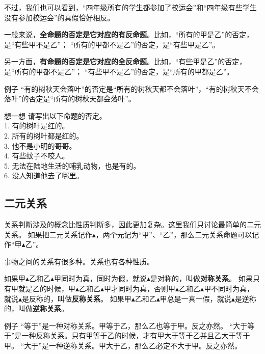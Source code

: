 \documentclass[12pt,UTF8,a4paper]{article}
\begin{document}
不过，我们也可以看到，“四年级所有的学生都参加了校运会”和“四年级有些学生没有参加校运会”的真假恰好相反。

一般来说，\textbf{全命题的否定是它对应的有反命题}。比如，“所有的甲是乙”的否定，是“有些甲不是乙”；
“所有的甲都不是乙”的否定，是“有些甲是乙”。

另一方面，\textbf{有命题的否定是它对应的全反命题}。比如，“有些甲是乙”的否定，是“所有的甲都不是乙”；
“有些甲不是乙”的否定，是“所有的甲都是乙”。

\begin{blockin}{例子}
    “有的树秋天会落叶”的否定是“所有的树秋天都不会落叶”，“有的树秋天不会落叶”的否定是“所有的树秋天都会落叶”。
\end{blockin}

\begin{blockaft}{想一想}
    请写出以下命题的否定。\\
    1. 有的树叶是红的。\\
    2. 所有的树叶都是红的。 \\
    3. 他不是小明的哥哥。\\
    4. 有些蚊子不咬人。\\
    5. 无法在陆地生活的哺乳动物，也是有的。\\
    6. 没人知道他去了哪里。
\end{blockaft}

\subsection{二元关系}

关系判断涉及的概念比性质判断多，因此更加复杂。这里我们只讨论最简单的二元关系。
如果把二元关系记作$\blacktriangle$，两个元记为“甲”、“乙”，那么二元关系命题可以记作“甲$\blacktriangle$乙”。

事物之间的关系有很多种。关系也有各种性质。

如果甲$\blacktriangle$乙和乙$\blacktriangle$甲同时为真，同时为假，就说$\blacktriangle$是对称的，叫做\textbf{对称关系}。
如果只有甲就是乙的时候，甲$\blacktriangle$乙和乙$\blacktriangle$甲才同时为真，否则甲$\blacktriangle$乙和乙$\blacktriangle$甲不同时为真，就说$\blacktriangle$是反称的，叫做\textbf{反称关系}。
如果甲$\blacktriangle$乙和乙$\blacktriangle$甲总是一真一假，就说$\blacktriangle$是逆称的，叫做\textbf{逆称关系}。

\begin{blockin}{例子}
    “等于”是一种对称关系。甲等于乙，那么乙也等于甲。反之亦然。
    “大于等于”是一种反称关系。只有甲等于乙的时候，才有甲大于等于乙并且乙大于等于甲。   
    “大于”是一种逆称关系。甲大于乙，那么乙必定不大于甲。反之亦然。
\end{blockin}
\end{document}
